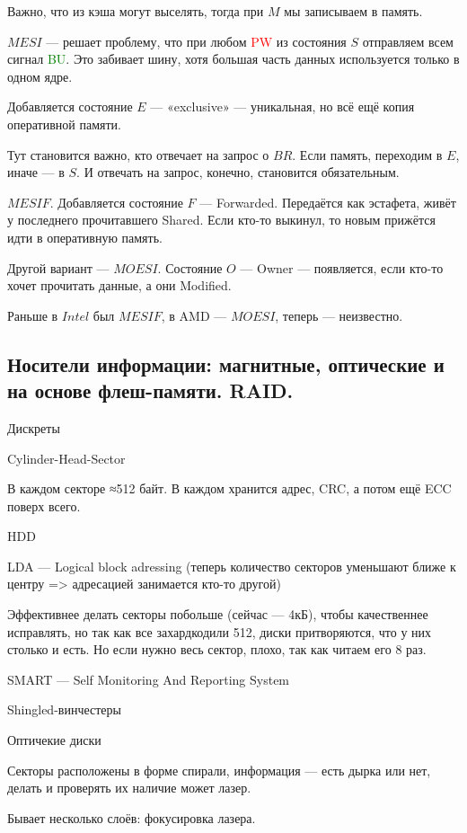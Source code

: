 \documentclass[12pt, a4paper]{article}
\begin{document}
Важно, что из кэша могут выселять, тогда при $M$ мы записываем в память.

$MESI$ — решает проблему, что при любом \textcolor{red}{PW} из состояния $S$ отправляем всем сигнал \textcolor{green}{BU}.
Это забивает шину, хотя большая часть данных используется только в одном ядре.

Добавляется состояние $E$ — «exclusive» — уникальная, но всё ещё копия оперативной памяти.

Тут становится важно, кто отвечает на запрос о $BR$. Если память, переходим в $E$, иначе — в $S$.
И отвечать на запрос, конечно, становится обязательным.

$MESIF$. Добавляется состояние $F$ — Forwarded. Передаётся как эстафета, живёт у последнего прочитавшего Shared.
Если кто-то выкинул, то новым прижётся идти в оперативную память.


Другой вариант — $MOESI$. Состояние $O$ — Owner — появляется, если кто-то хочет прочитать данные, а они Modified.

Раньше в $Intel$ был $MESIF$, в AMD — $MOESI$, теперь — неизвестно.

\subsection{Носители информации: магнитные, оптические и на основе флеш-памяти. RAID.}

Дискреты

Cylinder-Head-Sector

В каждом секторе ≈512 байт. В каждом хранится адрес, CRC, а потом ещё ECC поверх всего.

HDD

LDA — Logical block adressing (теперь количество секторов уменьшают ближе к центру => адресацией занимается кто-то другой)

Эффективнее делать секторы побольше (сейчас — 4кБ), чтобы качественнее исправлять, но так как все захардкодили 512, 
диски притворяются, что у них столько и есть. Но если нужно весь сектор, плохо, так как читаем его 8 раз.

SMART — Self Monitoring And Reporting System

Shingled-винчестеры

Оптичекие диски

Секторы расположены в форме спирали, информация — есть дырка или нет, делать и проверять их наличие может лазер.

Бывает несколько слоёв: фокусировка лазера.
\end{document}
